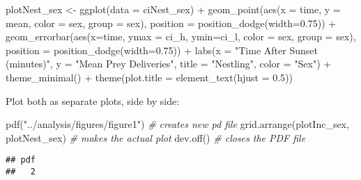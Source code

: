 \documentclass[
]{article}
\newenvironment{Shaded}{\begin{snugshade}}{\end{snugshade}}
\newcommand{\AttributeTok}[1]{\textcolor[rgb]{0.77,0.63,0.00}{#1}}
\newcommand{\CommentTok}[1]{\textcolor[rgb]{0.56,0.35,0.01}{\textit{#1}}}
\newcommand{\FloatTok}[1]{\textcolor[rgb]{0.00,0.00,0.81}{#1}}
\newcommand{\FunctionTok}[1]{\textcolor[rgb]{0.00,0.00,0.00}{#1}}
\newcommand{\NormalTok}[1]{#1}
\newcommand{\OtherTok}[1]{\textcolor[rgb]{0.56,0.35,0.01}{#1}}
\newcommand{\SpecialCharTok}[1]{\textcolor[rgb]{0.00,0.00,0.00}{#1}}
\newcommand{\StringTok}[1]{\textcolor[rgb]{0.31,0.60,0.02}{#1}}
\begin{document}
\begin{Shaded}
\begin{Highlighting}[]
\NormalTok{plotNest\_sex }\OtherTok{\textless{}{-}} \FunctionTok{ggplot}\NormalTok{(}\AttributeTok{data =}\NormalTok{ ciNest\_sex) }\SpecialCharTok{+}
  \FunctionTok{geom\_point}\NormalTok{(}\FunctionTok{aes}\NormalTok{(}\AttributeTok{x =}\NormalTok{ time, }\AttributeTok{y =}\NormalTok{ mean, }\AttributeTok{color =}\NormalTok{ sex, }\AttributeTok{group =}\NormalTok{ sex),}
             \AttributeTok{position =} \FunctionTok{position\_dodge}\NormalTok{(}\AttributeTok{width=}\FloatTok{0.75}\NormalTok{)) }\SpecialCharTok{+}
  \FunctionTok{geom\_errorbar}\NormalTok{(}\FunctionTok{aes}\NormalTok{(}\AttributeTok{x=}\NormalTok{time, }\AttributeTok{ymax =}\NormalTok{ ci\_h, }\AttributeTok{ymin=}\NormalTok{ci\_l, }\AttributeTok{color =}\NormalTok{ sex, }
                    \AttributeTok{group =}\NormalTok{ sex),}
                \AttributeTok{position =} \FunctionTok{position\_dodge}\NormalTok{(}\AttributeTok{width=}\FloatTok{0.75}\NormalTok{)) }\SpecialCharTok{+}
  \FunctionTok{labs}\NormalTok{(}\AttributeTok{x =} \StringTok{"Time After Sunset (minutes)"}\NormalTok{, }\AttributeTok{y =} \StringTok{"Mean Prey Deliveries"}\NormalTok{, }
       \AttributeTok{title =} \StringTok{"Nestling"}\NormalTok{, }\AttributeTok{color =} \StringTok{"Sex"}\NormalTok{) }\SpecialCharTok{+}
  \FunctionTok{theme\_minimal}\NormalTok{() }\SpecialCharTok{+}
  \FunctionTok{theme}\NormalTok{(}\AttributeTok{plot.title =} \FunctionTok{element\_text}\NormalTok{(}\AttributeTok{hjust =} \FloatTok{0.5}\NormalTok{))}
\end{Highlighting}
\end{Shaded}

Plot both as separate plots, side by side:

\begin{Shaded}
\begin{Highlighting}[]
\FunctionTok{pdf}\NormalTok{(}\StringTok{"../analysis/figures/figure1"}\NormalTok{)    }\CommentTok{\# creates new pd file}
\FunctionTok{grid.arrange}\NormalTok{(plotInc\_sex, plotNest\_sex)   }\CommentTok{\# makes the actual plot}
\FunctionTok{dev.off}\NormalTok{()     }\CommentTok{\# closes the PDF file}
\end{Highlighting}
\end{Shaded}

\begin{verbatim}
## pdf 
##   2
\end{verbatim}
\end{document}
